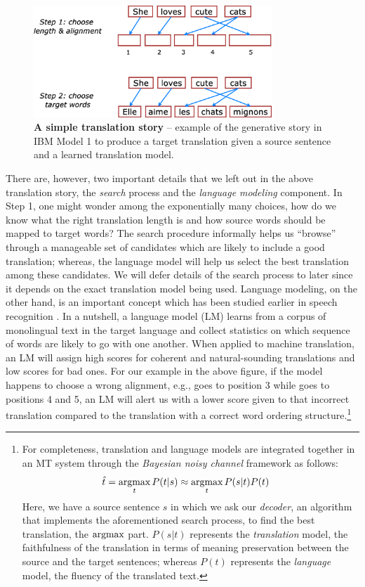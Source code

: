 \begin{figure}[tbh!]
\centering
\includegraphics[width=0.8\textwidth, clip=true, trim= 0 0 0
0]{img/wordmt_algo.eps}
\caption[A simple translation story]{{\bf A simple translation story} -- example of the generative story in
IBM Model 1 to produce a target translation given a source sentence and a
learned translation model.
} 
\label{f:wordmt_algo}
\end{figure}

There are, however, two important details that we left out in the above translation story,
the {\it search} process and the {\it language modeling} component. In Step 1,
one might wonder among the exponentially many choices, how do we know what the
right translation length is and how source words should be mapped to target words? The
search procedure informally helps us ``browse'' through a manageable set of
candidates which are likely to include a good translation; whereas, the language
model will help us select the best translation among these candidates. We will
defer details of the search process to later since it depends on the
exact translation model being used. Language modeling, on the other hand, is an
important concept which has been studied earlier in speech recognition
\cite{katz87}. In a nutshell, a language model (LM)
learns from a corpus of monolingual text in the target language and collect
statistics on which sequence of words are likely to go with one another. When
applied to machine translation, an LM will assign high scores for coherent and
natural-sounding translations and low scores for bad ones.
For our example in the above figure, if the model happens to choose a wrong alignment, e.g.,
 goes to position 3 while  goes to positions 4 and 5, an
LM will alert us with a lower score given to that incorrect translation  compared to the translation  with a correct word ordering structure.\footnote{
For completeness, translation and
language models are integrated together in an MT system through the {\it
Bayesian noisy channel} framework as follows:
\begin{align}
\label{e:noisy}
\hat{t} &= \mathop{\text{argmax}}_t P(t|s) \approx \mathop{\text{argmax}}_t P(s|t) P(t)
\end{align}
Here, we have a source sentence $s$ in which we ask our {\it decoder}, an
algorithm that implements the aforementioned search process, to find the best
translation, the $\mathop{\text{argmax}}$ part. $P(s|t)$ represents the {\it translation} model, the
faithfulness of the translation in terms of meaning preservation between the source and the
target sentences; whereas $P(t)$
represents the {\it language} model, the fluency of the translated text.
}

